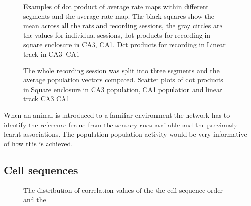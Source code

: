 \begin{figure}[htb!]
\centering
{}
\caption[Population Vector time course]{Examples of dot product of average rate maps within different segments and the average rate map. The black squares show the mean across all the rats and recording sessions, the gray circles are the values for individual sessions, dot products for recording in square enclosure in  CA3,  CA1. Dot products for recording in Linear track in  CA3,  CA1}
\end{figure}

\begin{figure}[htb!]
\centering
{}
\caption[CA3 Population Vector analysis]{The whole recording session was split into three segments and the average population vectors compared. Scatter plots of dot products in Square enclosure in  CA3 population,  CA1 population and linear track  CA3  CA1}
\end{figure}

When an animal is introduced to a familiar environment the network has to identify the reference frame from the sensory cues available and the previously learnt associations. The population population activity would be very informative of how this is achieved.\\[5cm]

\subsection{Cell sequences}
\begin{figure}[HTB!]
\centering
{}
\caption[CA3 post-trial sleep template match analysis]{The distribution of correlation values of the the cell sequence order and the }
\label{tmcorr}
\end{figure}
\section{}
